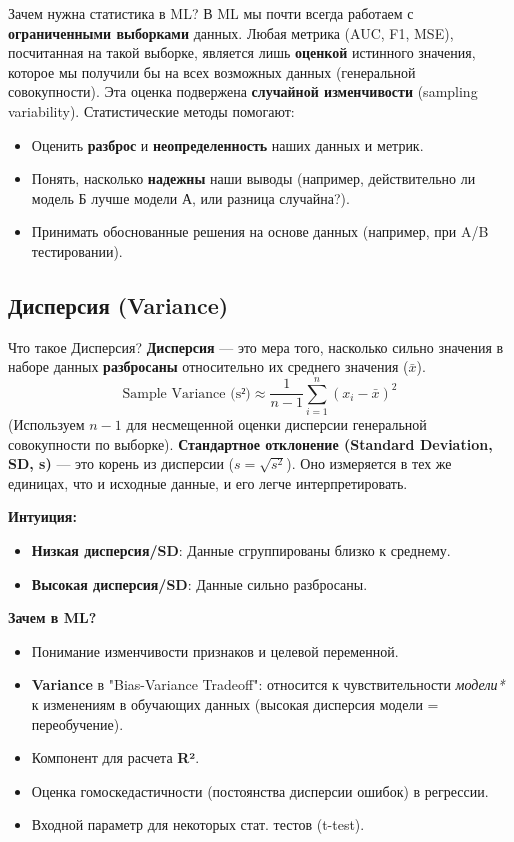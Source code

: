 \begin{alerttextbox}{Зачем нужна статистика в ML?}
В ML мы почти всегда работаем с \textbf{ограниченными выборками} данных. Любая метрика (AUC, F1, MSE), посчитанная на такой выборке, является лишь \textbf{оценкой} истинного значения, которое мы получили бы на всех возможных данных (генеральной совокупности). Эта оценка подвержена \textbf{случайной изменчивости} (sampling variability). Статистические методы помогают:
\begin{itemize}
    \item Оценить \textbf{разброс} и \textbf{неопределенность} наших данных и метрик.
    \item Понять, насколько \textbf{надежны} наши выводы (например, действительно ли модель Б лучше модели А, или разница случайна?).
    \item Принимать обоснованные решения на основе данных (например, при A/B тестировании).
\end{itemize}
\end{alerttextbox}

\subsection{Дисперсия (Variance)}

\begin{textbox}{Что такое Дисперсия?}
\textbf{Дисперсия} — это мера того, насколько сильно значения в наборе данных \textbf{разбросаны} относительно их среднего значения ($\bar{x}$).
\[
\text{Sample Variance (s²)} \approx \frac{1}{n-1} \sum_{i=1}^{n} (x_i - \bar{x})^2
\]
(Используем $n-1$ для несмещенной оценки дисперсии генеральной совокупности по выборке).
\textbf{Стандартное отклонение (Standard Deviation, SD, s)} — это корень из дисперсии ($s = \sqrt{s^2}$). Оно измеряется в тех же единицах, что и исходные данные, и его легче интерпретировать.

\textbf{Интуиция:}
\begin{itemize}
    \item \textbf{Низкая дисперсия/SD}: Данные сгруппированы близко к среднему.
    \item \textbf{Высокая дисперсия/SD}: Данные сильно разбросаны.
\end{itemize}

\textbf{Зачем в ML?}
\begin{itemize}
    \item Понимание изменчивости признаков и целевой переменной.
    \item \textbf{Variance} в "Bias-Variance Tradeoff": относится к чувствительности \textit{модели*} к изменениям в обучающих данных (высокая дисперсия модели = переобучение).
    \item Компонент для расчета \textbf{R²}.
    \item Оценка гомоскедастичности (постоянства дисперсии ошибок) в регрессии.
    \item Входной параметр для некоторых стат. тестов (t-test).
\end{itemize}
\end{textbox}

